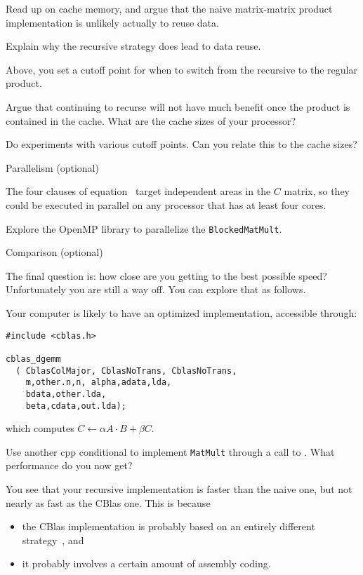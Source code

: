 \begin{exercise}
  Read up on cache memory, and argue that the naive matrix-matrix
  product implementation is unlikely actually to reuse data.

  Explain why the recursive strategy does lead to data reuse.
\end{exercise}

Above, you set a cutoff point for when to switch from the recursive to
the regular product.

\begin{exercise}
  Argue that continuing to recurse will not have much benefit once the
  product is contained in the cache. What are the cache sizes of your
  processor?

  Do experiments with various cutoff points. Can you relate this to
  the cache sizes?
\end{exercise}

 {Parallelism (optional)}

The four clauses of equation~ target independent
areas in the $C$ matrix, so they could be executed in parallel on any
processor that has at least four cores.

Explore the OpenMP library to parallelize the \lstinline{BlockedMatMult}.

 {Comparison (optional)}

The final question is: how close are you getting to the best possible
speed? Unfortunately you are still a way off. You can explore that as
follows.

Your computer is likely to have an optimized implementation,
accessible through:
\begin{lstlisting}
#include <cblas.h>

cblas_dgemm
  ( CblasColMajor, CblasNoTrans, CblasNoTrans,
    m,other.n,n, alpha,adata,lda,
    bdata,other.lda,
    beta,cdata,out.lda);
\end{lstlisting}
which computes $C\leftarrow \alpha A\cdot B+\beta C$.

\begin{exercise}
  Use another cpp conditional to implement \lstinline{MatMult} through
  a call to . What performance do you now get?
\end{exercise}

You see that your recursive implementation is faster than the naive
one, but not nearly as fast as the CBlas one. This is because
\begin{itemize}
\item the CBlas implementation is probably based on an entirely
  different strategy~\cite{GotoGeijn:2008:Anatomy}, and
\item it probably involves a certain amount of assembly coding.
\end{itemize}

